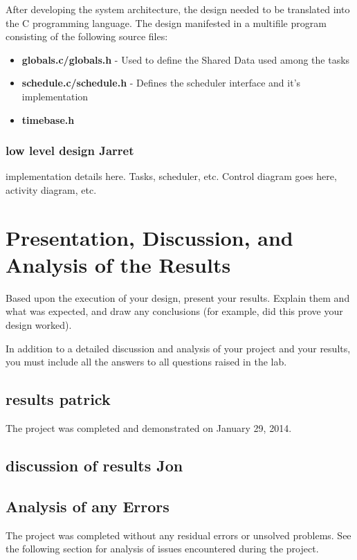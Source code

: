 \documentclass[12pt]{article} %
\begin{document}
After developing the system architecture, the design needed to be translated into the C programming language.  The design manifested in a multifile program consisting of the following source files:
\begin{itemize}
  \item \textbf{globals.c/globals.h} - Used to define the Shared Data used among the tasks
  \item \textbf{schedule.c/schedule.h} - Defines the scheduler interface and it's implementation
  \item \textbf{timebase.h}
\end{itemize}

\subsubsection{low level design  Jarret}

implementation details here. Tasks, scheduler, etc. Control diagram goes here, activity diagram, etc.

\section{Presentation, Discussion, and Analysis of the Results}

Based upon the execution of your design, present your results. Explain them and what was expected, and draw any conclusions (for example, did this prove your design worked).

In addition to a detailed discussion and analysis of your project and your results, you must include all the answers to all questions raised in the lab.
\subsection{results  patrick}
The project was completed and demonstrated on January 29, 2014. 



\subsection{discussion of results  Jon}

\subsection{Analysis of any Errors}
The project was completed without any residual errors or unsolved problems. See the following section for analysis of issues encountered during the project.
\end{document}
